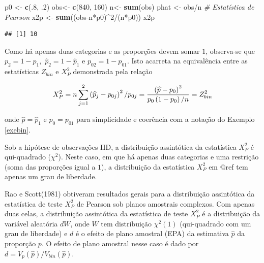 \documentclass[]{book}
\newenvironment{Shaded}{\begin{snugshade}}{\end{snugshade}}
\newcommand{\KeywordTok}[1]{\textcolor[rgb]{0.13,0.29,0.53}{\textbf{{#1}}}}
\newcommand{\DecValTok}[1]{\textcolor[rgb]{0.00,0.00,0.81}{{#1}}}
\newcommand{\StringTok}[1]{\textcolor[rgb]{0.31,0.60,0.02}{{#1}}}
\newcommand{\CommentTok}[1]{\textcolor[rgb]{0.56,0.35,0.01}{\textit{{#1}}}}
\newcommand{\NormalTok}[1]{{#1}}
\numberwithin{example}{chapter}
\numberwithin{remark}{chapter}
\numberwithin{definition}{chapter}
\begin{document}
\begin{Shaded}
\begin{Highlighting}[]
\NormalTok{p0 <-}\StringTok{ }\KeywordTok{c}\NormalTok{(.}\DecValTok{8}\NormalTok{, .}\DecValTok{2}\NormalTok{)}
\NormalTok{obs<-}\StringTok{ }\KeywordTok{c}\NormalTok{(}\DecValTok{840}\NormalTok{, }\DecValTok{160}\NormalTok{)}
\NormalTok{n<-}\StringTok{ }\KeywordTok{sum}\NormalTok{(obs)}
\NormalTok{phat <-}\StringTok{ }\NormalTok{obs/n}
\CommentTok{# Estatística de Pearson}
\NormalTok{x2p <-}\StringTok{ }\KeywordTok{sum}\NormalTok{((obs-n*p0)^}\DecValTok{2}\NormalTok{/(n*p0))}
\NormalTok{x2p}
\end{Highlighting}
\end{Shaded}

\begin{verbatim}
## [1] 10
\end{verbatim}

Como há apenas duas categorias e as proporções devem somar \(1\),
observa-se que \(p_{2}=1-p_{1},\) \(\widehat{p}_{2}=1-\widehat{p}_{1}\)
e \(p_{02}=1-p_{01}\). Isto acarreta na equivalência entre as
estatísticas \(Z_{bin}\) e \(X_{P}^{2}\) demonstrada pela relação

\begin{equation}
X_{P}^{2}=n\sum\limits_{j=1}^{2}\left( \widehat{p}%
_{j}-p_{0j}\right) ^{2}/p_{0j}=\frac{\left( \widehat{p}-p_{0}\right) ^{2}}{%
p_{0}\left( 1-p_{0}\right) /n}=Z_{bin}^{2}  
\label{eq:qual2}
\end{equation}

onde \(\widehat{p}=\widehat{p}_{1}\) e \(p_{0}=p_{01}\) para
simplicidade e coerência com a notação do Exemplo \ref{exebin}.

Sob a hipótese de observações IID, a distribuição assintótica da
estatística \(X_{P}^{2}\) é qui-quadrado (\(\chi^{2}\)). Neste caso, em
que há apenas duas categorias e uma restrição (soma das proporções igual
a \(1\)), a distribuição da estatística \(X_{P}^{2}\) em
@ref\label{eq:qual1} tem apenas um grau de liberdade.

Rao e Scott(1981) obtiveram resultados gerais para a distribuição
assintótica da estatística de teste \(X_{P}^{2}\) de Pearson sob planos
amostrais complexos. Com apenas duas celas, a distribuição assintótica
da estatística de teste \(X_{P}^{2}\) é a distribuição da variável
aleatória \(dW\), onde \(W\) tem distribuição
\(\chi ^{2}\left( 1\right)\) (qui-quadrado com um grau de liberdade) e
\(d\) é o efeito de plano amostral (EPA) da estimativa \(\widehat{p}\)
da proporção \(p\). O efeito de plano amostral nesse caso é dado por
\(d=V_{p}\left( \widehat{p}\right) /V_{bin}\left( \widehat{p}\right)\).
\end{document}
